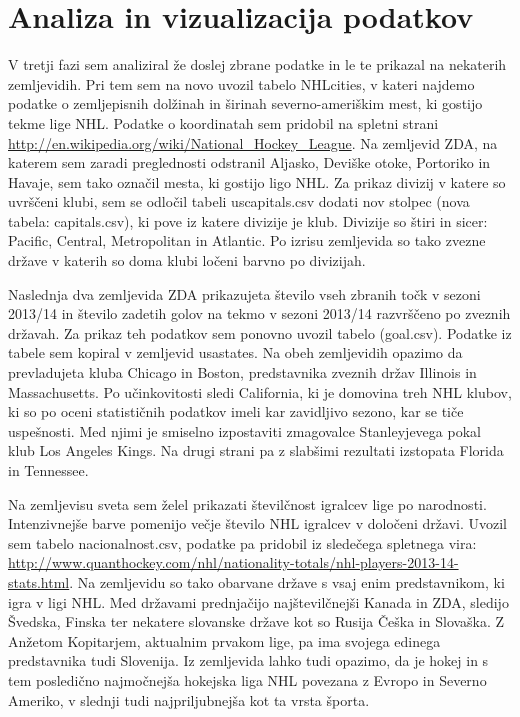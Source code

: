 \documentclass[11pt,a4paper]{article}
\begin{document}



\section{Analiza in vizualizacija podatkov}

V tretji fazi sem analiziral že doslej zbrane podatke in le te prikazal na nekaterih zemljevidih. Pri tem sem na novo uvozil tabelo NHLcities, v kateri najdemo podatke o zemljepisnih dolžinah in širinah severno-ameriškim mest, ki gostijo tekme lige NHL. Podatke o koordinatah sem pridobil na spletni strani \url{http://en.wikipedia.org/wiki/National_Hockey_League}. Na zemljevid ZDA, na katerem sem zaradi preglednosti odstranil Aljasko, Deviške otoke, Portoriko in Havaje, sem tako označil mesta, ki gostijo ligo NHL.
Za prikaz divizij v katere so uvrščeni klubi, sem se odločil tabeli uscapitals.csv dodati nov stolpec (nova tabela: capitals.csv), ki pove iz katere divizije je klub. Divizije so štiri in sicer: Pacific, Central, Metropolitan in Atlantic. Po izrisu zemljevida so tako zvezne države v katerih so doma klubi ločeni barvno po divizijah. 

Naslednja dva zemljevida ZDA prikazujeta število vseh zbranih točk v sezoni 2013/14 in število zadetih golov na tekmo v sezoni 2013/14 razvrščeno po zveznih državah. Za prikaz teh podatkov sem ponovno uvozil tabelo (goal.csv). Podatke iz tabele sem kopiral v zemljevid usastates. Na obeh zemljevidih opazimo da prevladujeta kluba Chicago in Boston, predstavnika zveznih držav Illinois in Massachusetts. Po učinkovitosti sledi California, ki je domovina treh NHL klubov, ki so po oceni statističnih podatkov imeli kar zavidljivo sezono, kar se tiče uspešnosti. Med njimi je smiselno izpostaviti zmagovalce Stanleyjevega pokal klub Los Angeles Kings. Na drugi strani pa z slabšimi rezultati izstopata Florida in Tennessee.

Na zemljevisu sveta sem želel prikazati številčnost igralcev lige po narodnosti. Intenzivnejše barve pomenijo večje število NHL igralcev v določeni državi. Uvozil sem tabelo nacionalnost.csv, podatke pa pridobil iz sledečega spletnega vira: \url{http://www.quanthockey.com/nhl/nationality-totals/nhl-players-2013-14-stats.html}. Na zemljevidu so tako obarvane države s vsaj enim predstavnikom, ki igra v ligi NHL. Med državami prednjačijo najštevilčnejši Kanada in ZDA, sledijo Švedska, Finska ter nekatere slovanske države kot so Rusija Češka in Slovaška. Z Anžetom Kopitarjem, aktualnim prvakom lige, pa ima svojega edinega predstavnika tudi Slovenija. Iz zemljevida lahko tudi opazimo, da je hokej in s tem posledično najmočnejša hokejska liga NHL povezana z Evropo in Severno Ameriko, v slednji tudi najpriljubnejša kot ta vrsta športa.
\newpage
\end{document}
